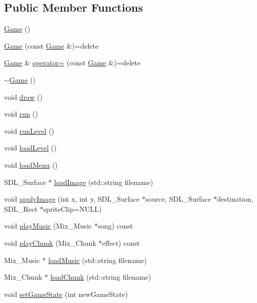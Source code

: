 \subsection*{Public Member Functions}
\begin{DoxyCompactItemize}
\item 
\hyperlink{classGame_ad59df6562a58a614fda24622d3715b65}{Game} ()
\item 
\hyperlink{classGame_abb28875d74d25fa9e0dcdbe37c6ad89c}{Game} (const \hyperlink{classGame}{Game} \&)=delete
\item 
\hyperlink{classGame}{Game} \& \hyperlink{classGame_a4d0c0503733cc50b0b5cb8d7ef1237ec}{operator=} (const \hyperlink{classGame}{Game} \&)=delete
\item 
\hyperlink{classGame_ae3d112ca6e0e55150d2fdbc704474530}{$\sim$\-Game} ()
\item 
void \hyperlink{classGame_a6d54497ce3a66f6dd45eacfdccc8d0bd}{draw} ()
\item 
void \hyperlink{classGame_a1ab78f5ed0d5ea879157357cf2fb2afa}{run} ()
\item 
void \hyperlink{classGame_a8d5df01e8f891aa5bb01153a66692dd6}{run\-Level} ()
\item 
void \hyperlink{classGame_a9713f011d2d0d3ef4a37aa07d7951947}{load\-Level} ()
\item 
void \hyperlink{classGame_a69c0505b09d39a511eb9c7d44a8cd46e}{load\-Menu} ()
\item 
S\-D\-L\-\_\-\-Surface $\ast$ \hyperlink{classGame_a007a16399b4c563e1a41e1060a7e2db7}{load\-Image} (std\-::string filename)
\item 
void \hyperlink{classGame_a95c19db69b73a56245e41ce9fd639b31}{apply\-Image} (int x, int y, S\-D\-L\-\_\-\-Surface $\ast$source, S\-D\-L\-\_\-\-Surface $\ast$destination, S\-D\-L\-\_\-\-Rect $\ast$sprite\-Clip=N\-U\-L\-L)
\item 
void \hyperlink{classGame_abac16174982079a0c46f0626ada16d54}{play\-Music} (Mix\-\_\-\-Music $\ast$song) const 
\item 
void \hyperlink{classGame_abe33184093d0ae79d40e5ac3521febbb}{play\-Chunk} (Mix\-\_\-\-Chunk $\ast$effect) const 
\item 
Mix\-\_\-\-Music $\ast$ \hyperlink{classGame_a3b0626d1e61c88b1630cd7fd1f9371a9}{load\-Music} (std\-::string filename)
\item 
Mix\-\_\-\-Chunk $\ast$ \hyperlink{classGame_ac5ca4ad10b022c71b07622898c0e17b8}{load\-Chunk} (std\-::string filename)
\item 
void \hyperlink{classGame_aed11a603c8dd060fc5de09e74669a0df}{set\-Game\-State} (int new\-Game\-State)

\end{DoxyCompactItemize}
